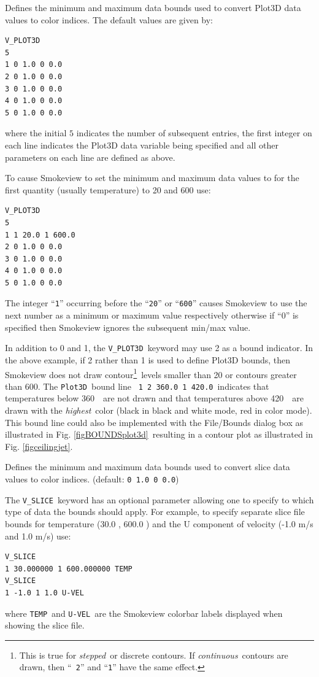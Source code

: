 \documentclass[11pt,twoside]{book}
\newcommand{\hitem}[1]{\item[{\bf #1} \hfill]}
\begin{document}
\hitem{V\_PLOT3D}Defines the minimum and maximum data bounds used
to convert Plot3D data values to color indices. The default values
are given by:
\begin{lstlisting}
V_PLOT3D
5
1 0 1.0 0 0.0
2 0 1.0 0 0.0
3 0 1.0 0 0.0
4 0 1.0 0 0.0
5 0 1.0 0 0.0
\end{lstlisting}
where the initial $5$ indicates the number of subsequent entries,
the first integer on each line indicates the Plot3D data variable
being specified and all other parameters on each line are defined
as above.

To cause Smokeview to set the minimum and maximum data values to
for the first quantity (usually temperature) to 20 and 600 use:

\begin{lstlisting}
V_PLOT3D
5
1 1 20.0 1 600.0
2 0 1.0 0 0.0
3 0 1.0 0 0.0
4 0 1.0 0 0.0
5 0 1.0 0 0.0
\end{lstlisting}
The integer ``{\tt 1}'' occurring before the ``{\tt 20}'' or
``{\tt 600}'' causes Smokeview to use the next number as a minimum
or maximum value respectively otherwise if ``0'' is specified then
Smokeview ignores the subsequent min/max value.

In addition to 0 and 1, the {\tt V\_PLOT3D}\ keyword may use 2 as a
bound indicator. In the above example, if 2 rather than 1 is used
to define Plot3D bounds, then Smokeview does not draw
contour\footnote{This is true for {\em stepped}\ or discrete
contours.  If {\em continuous}\ contours are drawn, then ``{\tt
2}'' and ``{\tt 1}'' have the same effect. }\ levels smaller than
20 or contours greater than 600. The {\tt Plot3D}\ bound line {\tt
1 2 360.0 1 420.0}\ indicates that temperatures below 360~\degC\
are not drawn and that temperatures above 420~\degC\ are drawn
with the {\em highest}\ color (black in black and white mode, red
in color mode).  This bound line could also be implemented with
the File/Bounds dialog box as illustrated in Fig.
\ref{figBOUNDSplot3d}\ resulting in a contour plot as illustrated
in Fig. \ref{figceilingjet}.


\hitem{V\_SLICE}Defines the minimum and maximum
data bounds used to convert slice data values to color indices.
(default: {\tt 0 1.0 0 0.0})

The {\tt V\_SLICE}\ keyword has an optional parameter allowing one
to specify to which type of data the bounds should apply.  For
example, to specify separate slice file bounds for temperature
(30.0 \degC, 600.0 \degC) and the U component of velocity (-1.0
m/s and 1.0 m/s) use:
\begin{lstlisting}
V_SLICE
1 30.000000 1 600.000000 TEMP
V_SLICE
1 -1.0 1 1.0 U-VEL
\end{lstlisting}
where {\tt TEMP}\ and {\tt U-VEL}\ are the Smokeview colorbar labels
displayed when showing the slice file.
\end{document}
